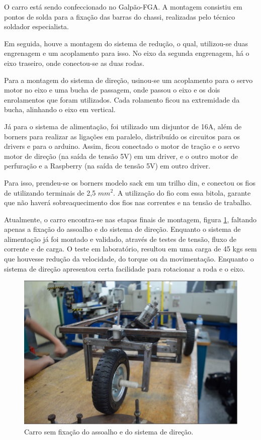 
O carro está sendo confeccionado no Galpão-FGA. A montagem consistiu em pontos de solda para a fixação das barras do chassi, realizadas pelo técnico soldador especialista.

Em seguida, houve a montagem do sistema de redução, o qual, utilizou-se duas engrenagem e um acoplamento para isso. No eixo da segunda engrenagem, há o eixo traseiro, onde conectou-se as duas rodas.

Para a montagem do sistema de direção, usinou-se um acoplamento para o servo motor no eixo e uma bucha de passagem, onde passou o eixo e os dois enrolamentos que foram utilizados. Cada rolamento ficou na extremidade da bucha, alinhando o eixo em vertical.

Já para o sistema de alimentação, foi utilizado um disjuntor de 16A, além de borners para realizar as ligações em paralelo, distribuído os circuitos para os drivers e para o arduino. Assim, ficou conectado o motor de tração e o servo motor de direção (na saída de tensão 5V) em um driver, e o outro motor de perfuração e a Raspberry (na saída de tensão 5V) em outro driver.

Para isso, prendeu-se os borners modelo sack em um trilho din, e conectou os fios de utilizando terminais de 2,5 $mm^2$. A utilização do fio com essa bitola, garante que não haverá sobreaquecimento dos fios nas correntes e na tensão de trabalho.

Atualmente, o carro encontra-se nas etapas finais de montagem, figura \ref{fig:carro_quase_montado}, faltando apenas a fixação do assoalho e do sistema de direção. Enquanto o sistema de alimentação já foi montado e validado, através de testes de tensão, fluxo de corrente e de carga. O teste em laboratório, resultou em uma carga de 45 kgs sem que houvesse redução da velocidade, do torque ou da movimentação. Enquanto o sistema de direção apresentou certa facilidade para rotacionar a roda e o eixo.

\begin{figure}[!htbp]
\begin{center}
\includegraphics[width=1\textwidth]{figuras/carro_quase_montado.eps}
\caption{\label{fig:carro_quase_montado}Carro sem fixação do assoalho e do sistema de direção.}
\end{center}
\end{figure}

